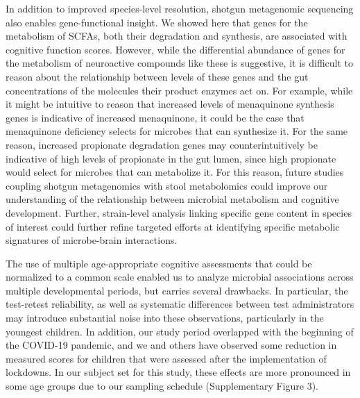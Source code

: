 \documentclass[a4paper]{article}
\begin{document}
In addition to improved species-level resolution, shotgun metagenomic
sequencing also enables gene-functional insight. We showed here that
genes for the metabolism of SCFAs, both their degradation and synthesis,
are associated with cognitive function scores. However, while the
differential abundance of genes for the metabolism of neuroactive
compounds like these is suggestive, it is difficult to reason about the
relationship between levels of these genes and the gut concentrations of
the molecules their product enzymes act on. For example, while it might
be intuitive to reason that increased levels of menaquinone synthesis
genes is indicative of increased menaquinone, it could be the case that
menaquinone deficiency selects for microbes that can synthesize it. For
the same reason, increased propionate degradation genes may
counterintuitively be indicative of high levels of propionate in the gut
lumen, since high propionate would select for microbes that can
metabolize it. For this reason, future studies coupling shotgun
metagenomics with stool metabolomics could improve our understanding of
the relationship between microbial metabolism and cognitive development.
Further, strain-level analysis linking specific gene content in species
of interest could further refine targeted efforts at identifying
specific metabolic signatures of microbe-brain interactions.

The use of multiple age-appropriate cognitive assessments that could be
normalized to a common scale enabled us to analyze microbial
associations across multiple developmental periods, but carries several
drawbacks. In particular, the test-retest reliability, as well as
systematic differences between test administrators may introduce
substantial noise into these observations, particularly in the youngest
children. In addition, our study period overlapped with the beginning of
the COVID-19 pandemic, and we and others have observed some reduction in
measured scores for children that were assessed after the implementation
of lockdowns. In our subject set for this study, these effects are more
pronounced in some age groups due to our sampling schedule
\cite{blackwellYouthWellbeingCOVID192022,deoniImpactCOVID19Pandemic2021}
(Supplementary Figure 3).
\end{document}
